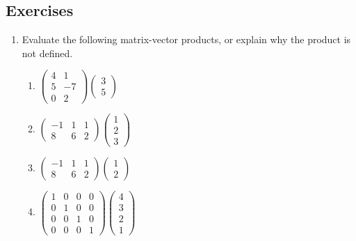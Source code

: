 \documentclass[12pt]{article}
\numberwithin{equation}{subsection}
\numberwithin{figure}{subsection}
\theoremstyle{note}
\begin{document}
\subsection{Exercises}
\begin{enumerate}[label=\arabic*.]
	\item Evaluate the following matrix-vector products, or explain why the product is not defined. 
	\begin{enumerate}
		\item $\begin{pmatrix} 4 & 1 \\ 5 & -7 \\ 0 & 2\end{pmatrix} \begin{pmatrix} 3 \\ 5\end{pmatrix}$
		\item $\begin{pmatrix} -1 & 1 & 1 \\ 8 & 6 & 2 \end{pmatrix} \begin{pmatrix} 1 \\ 2 \\ 3\end{pmatrix}$
		\item $\begin{pmatrix} -1 & 1 & 1 \\ 8 & 6 & 2 \end{pmatrix} \begin{pmatrix} 1 \\ 2 \end{pmatrix}$\
		\item $\begin{pmatrix} 1 & 0 & 0 & 0 \\ 0 & 1 & 0 & 0 \\ 0 & 0 & 1 & 0 \\ 0 & 0 & 0 & 1 \end{pmatrix} \begin{pmatrix} 4 \\ 3 \\ 2\\ 1\end{pmatrix}$
	\end{enumerate}
	

\end{enumerate}
\end{document}
